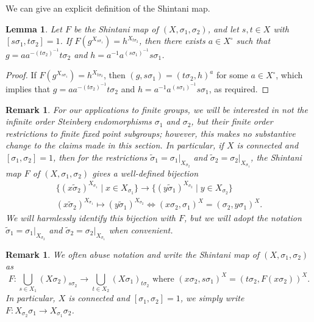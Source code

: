 \documentclass[11pt]{article}
\numberwithin{equation}{section}
\theoremstyle{shdefinition}
\newtheorem{remark}[definition]{Remark}
\theoremstyle{shplain}
\newtheorem{lemma}[definition]{Lemma}
\newcommand{\s}{\sigma}
\newcommand{\ws}{\widetilde{\sigma}}
\newcommand{\<}{\langle}
\renewcommand{\>}{\rangle}
\renewcommand{\:}{\colon}
\begin{document}
We can give an explicit definition of the Shintani map.

\begin{lemma} \label{lem:shintani_explicit}
Let $F$ be the Shintani map of $(X,\s_1,\s_2)$, and let $s,t \in X$ with $[s\s_1,t\s_2] = 1$. If $F(g^{X_{s\s_1}}) = h^{X_{t\s_2}}$, then there exists $a \in X^\circ$ such that $g = aa^{-(t\s_2)^{-1}}t\s_2$ and $h = a^{-1}a^{(s\s_1)^{-1}}s\s_1$.
\end{lemma}

\begin{proof} 
If $F(g^{X_{s\s_1}}) = h^{X_{t\s_2}}$, then $(g,s\s_1) = (t\s_2,h)^a$ for some $a \in X^\circ$, which implies that $g = aa^{-(t\s_2)^{-1}}t\s_2$ and $h = a^{-1}a^{(s\s_1)^{-1}}s\s_1$, as required.
\end{proof}

\begin{remark} \label{rem:shintani_tilde}
For our applications to finite groups, we will be interested in not the infinite order Steinberg endomorphisms $\s_1$ and $\s_2$, but their finite order restrictions to finite fixed point subgroups; however, this makes no substantive change to the claims made in this section. In particular, if $X$ is connected and $[\s_1,\s_2]=1$, then for the restrictions $\ws_1 = \s_1|_{X_{\s_2}}$ and $\ws_2 = \s_2|_{X_{\s_1}}$, the Shintani map $F$ of $(X,\s_1,\s_2)$ gives a well-defined bijection
\begin{gather*}
\{ (x\ws_2)^{X_{\s_1}} \mid x \in X_{\s_1} \} \to \{ (y\ws_1)^{X_{\s_2}} \mid y \in X_{\s_2} \} \\[5pt]
(x\ws_2)^{X_{\s_1}} \mapsto (y\ws_1)^{X_{\s_2}} \iff (x\s_2,\s_1)^X = (\s_2,y\s_1)^X. 
\end{gather*}
We will harmlessly identify this bijection with $F$, but we will adopt the notation $\ws_1 = \s_1|_{X_{\s_2}}$ and $\ws_2 = \s_2|_{X_{\s_1}}$ when convenient.
\end{remark}

\begin{remark} \label{rem:shintani_notation}
We often abuse notation and write the Shintani map of $(X,\s_1,\s_2)$ as
\[
\text{$F\:\bigcup_{s \in X_1} (X\s_2)_{s\s_2} \to \bigcup_{t \in X_2} (X\s_1)_{t\s_2}$ \ where \ $(x\s_2,s\s_1)^X = (t\s_2,F(x\s_2))^X$}.
\]
In particular, $X$ is connected and $[\s_1,\s_2]=1$, we simply write $F\:X_{\s_2}\s_1 \to X_{\s_1}\s_2$.
\end{remark}
\end{document}
